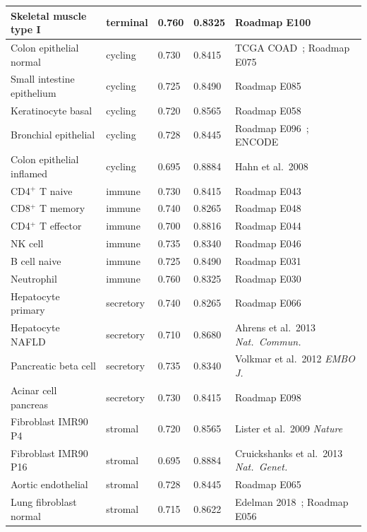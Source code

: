 \documentclass[12pt,a4paper]{article}
\begin{document}
\begin{longtable}{p{4.2cm}p{2.0cm}p{1.0cm}p{1.0cm}p{5.5cm}}
Skeletal muscle type I    & terminal    & 0.760 & 0.8325 & Roadmap E100 \cite{Roadmap2015} \\
\midrule
Colon epithelial normal   & cycling     & 0.730 & 0.8415 & TCGA COAD~\cite{TCGA_COAD2012}; Roadmap E075~\cite{Roadmap2015} \\
Small intestine epithelium& cycling     & 0.725 & 0.8490 & Roadmap E085 \cite{Roadmap2015} \\
Keratinocyte basal        & cycling     & 0.720 & 0.8565 & Roadmap E058 \cite{Roadmap2015} \\
Bronchial epithelial      & cycling     & 0.728 & 0.8445 & Roadmap E096~\cite{Roadmap2015}; ENCODE~\cite{ENCODE2012} \\
Colon epithelial inflamed & cycling     & 0.695 & 0.8884 & Hahn et al.\ 2008~\cite{Hahn2008} \\
\midrule
CD4$^+$ T naive           & immune      & 0.730 & 0.8415 & Roadmap E043 \cite{Roadmap2015} \\
CD8$^+$ T memory          & immune      & 0.740 & 0.8265 & Roadmap E048 \cite{Roadmap2015} \\
CD4$^+$ T effector        & immune      & 0.700 & 0.8816 & Roadmap E044 \cite{Roadmap2015} \\
NK cell                   & immune      & 0.735 & 0.8340 & Roadmap E046 \cite{Roadmap2015} \\
B cell naive              & immune      & 0.725 & 0.8490 & Roadmap E031 \cite{Roadmap2015} \\
Neutrophil                & immune      & 0.760 & 0.8325 & Roadmap E030 \cite{Roadmap2015} \\
\midrule
Hepatocyte primary        & secretory   & 0.740 & 0.8265 & Roadmap E066 \cite{Roadmap2015} \\
Hepatocyte NAFLD          & secretory   & 0.710 & 0.8680 & Ahrens et al.\ 2013 \textit{Nat.\ Commun.}~\cite{Ahrens2013} \\
Pancreatic beta cell      & secretory   & 0.735 & 0.8340 & Volkmar et al.\ 2012 \textit{EMBO J.}~\cite{Volkmar2012} \\
Acinar cell pancreas      & secretory   & 0.730 & 0.8415 & Roadmap E098 \cite{Roadmap2015} \\
\midrule
Fibroblast IMR90 P4       & stromal     & 0.720 & 0.8565 & Lister et al.\ 2009 \textit{Nature} \cite{Lister2009} \\
Fibroblast IMR90 P16      & stromal     & 0.695 & 0.8884 & Cruickshanks et al.\ 2013 \textit{Nat.\ Genet.}~\cite{Cruickshanks2013} \\
Aortic endothelial        & stromal     & 0.728 & 0.8445 & Roadmap E065 \cite{Roadmap2015} \\
Lung fibroblast normal    & stromal     & 0.715 & 0.8622 & Edelman 2018~\cite{Edelman2018}; Roadmap E056~\cite{Roadmap2015} \\

\end{longtable}
\end{document}
